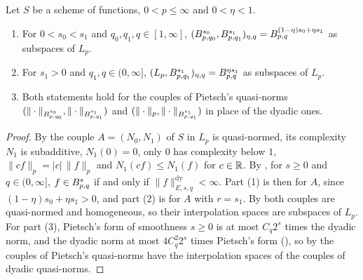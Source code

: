 \begin{theorem}
\label{thm:besov-interpolate}
\leanok
{}
Let $S$ be a scheme of functions, $0 < p \leq \infty$ and $0 < \eta < 1$.
\begin{enumerate}
  \item For $0 < s_0 < s_1$ and $q_0, q_1, q \in [1, \infty]$,
    $(B^{s_0}_{p,q_0}, B^{s_1}_{p,q_1})_{\eta, q}
    = B^{(1-\eta)s_0 + \eta s_1}_{p,q}$ as subspaces of $L_p$.
  \item For $s_1 > 0$ and $q_1, q \in (0, \infty]$,
    $(L_p, B^{s_1}_{p,q_1})_{\eta, q} = B^{\eta s_1}_{p,q}$ as subspaces of $L_p$.
  \item Both statements hold for the couples of Pietsch's quasi-norms
    $(\|\cdot\|_{B^{s_0}_{p,q_0}}, \|\cdot\|_{B^{s_1}_{p,q_1}})$ and
    $(\|\cdot\|_p, \|\cdot\|_{B^{s_1}_{p,q_1}})$ in place of the dyadic ones.
\end{enumerate}
\end{theorem}

\begin{proof}
\leanok
{}
By  the couple $A = (N_0, N_1)$ of $S$ in $L_p$ is quasi-normed,
its complexity $N_1$ is subadditive, $N_1(0) = 0$, only $0$ has complexity below $1$,
$\|cf\|_p = |c| \, \|f\|_p$ and $N_1(cf) \leq N_1(f)$ for $c \in \mathbb{R}$. By ,
for $s \geq 0$ and $q \in (0, \infty]$, $f \in B^{s}_{p,q}$ if and only if
$\|f\|^{\mathrm{dy}}_{E, s, q} < \infty$. Part (1) is then  for
$A$, since $(1 - \eta) s_0 + \eta s_1 > 0$, and part (2) is  for
$A$ with $r = s_1$. By  both couples are quasi-normed and homogeneous, so
their interpolation spaces are subspaces of $L_p$. For part (3), Pietsch's form of smoothness
$s \geq 0$ is at most $C_q 2^s$ times the dyadic norm, and the dyadic norm at most
$4 C_q^2 2^s$ times Pietsch's form (), so by
 the couples of Pietsch's quasi-norms have the interpolation spaces
of the couples of dyadic quasi-norms.
\end{proof}

